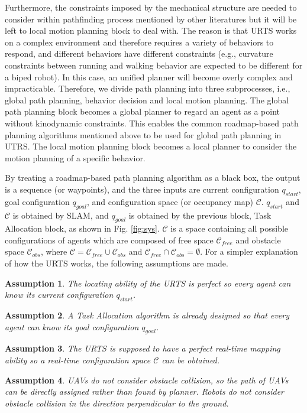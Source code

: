 \documentclass{ieeeaccess}
\newtheorem{assumption}{Assumption}[section]
\begin{document}
Furthermore, the constraints imposed by the mechanical structure are needed to consider within pathfinding process mentioned by other literatures but it will be left to local motion planning block to deal with. The reason is that URTS works on a complex environment and therefore requires a variety of behaviors to respond, and different behaviors have different constraints (e.g., curvature constraints between running and walking behavior are expected to be different for a biped robot). In this case, an unified planner will become overly complex and impracticable. Therefore, we divide path planning into three subprocesses, i.e., global path planning, behavior decision and local motion planning. The global path planning block becomes a global planner to regard an agent as a point without kinodynamic constraints. This enables the common roadmap-based path planning algorithms mentioned above to be used for global path planning in UTRS. The local motion planning block becomes a local planner to consider the motion planning of a specific behavior.

By treating a roadmap-based path planning algorithm as a black box, the output is a sequence (or waypoints), and the three inputs are current configuration $q_{start}$, goal configuration $q_{goal}$, and configuration space (or occupancy map) $\mathcal{C}$. $q_{start}$ and $\mathcal{C}$ is obtained by SLAM, and $q_{goal}$ is obtained by the previous block, Task Allocation block, as shown in Fig. \ref{fig:sys}. $\mathcal{C}$ is a space containing all possible configurations of agents which are composed of free space $\mathcal{C}_{free}$ and obstacle space $\mathcal{C}_{obs}$, where $\mathcal{C}=\mathcal{C}_{free}\cup\mathcal{C}_{obs}$ and $\mathcal{C}_{free}\cap\mathcal{C}_{obs}=\emptyset$. For a simpler explanation of how the URTS works, the following assumptions are made.

\begin{assumption}
    The locating ability of the URTS is perfect so every agent can know its current configuration $q_{start}$.
\end{assumption}
\begin{assumption}
    A Task Allocation algorithm is already designed so that every agent can know its goal configuration $q_{goal}$.
\end{assumption}
\begin{assumption}
    The URTS is supposed to have a perfect real-time mapping ability so a real-time configuration space $\mathcal{C}$ can be obtained.
\end{assumption}
\begin{assumption} \label{asm:collision} %
    UAVs do not consider obstacle collision, so the path of UAVs can be directly assigned rather than found by planner. Robots do not consider obstacle collision in the direction perpendicular to the ground. 
\end{assumption}
\end{document}
